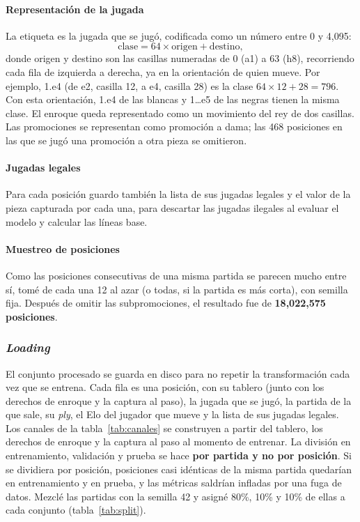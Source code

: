 \documentclass[a4paper,12pt,twocolumn]{article}
\begin{document}
\paragraph{Representación de la jugada}

La etiqueta es la jugada que se jugó, codificada como un número entre 0 y 4,095:
\begin{equation*}
	\text{clase} = 64 \times \text{origen} + \text{destino},
\end{equation*}
donde origen y destino son las casillas numeradas de 0 (a1) a 63 (h8), recorriendo cada fila de izquierda a derecha, ya en la orientación de quien mueve. Por ejemplo, 1.e4 (de e2, casilla 12, a e4, casilla 28) es la clase $64\times12+28=796$. Con esta orientación, 1.e4 de las blancas y 1\dots e5 de las negras tienen la misma clase. El enroque queda representado como un movimiento del rey de dos casillas. Las promociones se representan como promoción a dama; las 468 posiciones en las que se jugó una promoción a otra pieza se omitieron.

\paragraph{Jugadas legales}

Para cada posición guardo también la lista de sus jugadas legales y el valor de la pieza capturada por cada una, para descartar las jugadas ilegales al evaluar el modelo y calcular las líneas base.

\paragraph{Muestreo de posiciones}

Como las posiciones consecutivas de una misma partida se parecen mucho entre sí, tomé de cada una 12 al azar (o todas, si la partida es más corta), con semilla fija. Después de omitir las subpromociones, el resultado fue de \textbf{18,022,575 posiciones}.

\subsubsection{\textit{Loading}}

El conjunto procesado se guarda en disco para no repetir la transformación cada vez que se entrena. Cada fila es una posición, con su tablero (junto con los derechos de enroque y la captura al paso), la jugada que se jugó, la partida de la que sale, su \textit{ply}, el Elo del jugador que mueve y la lista de sus jugadas legales. Los canales de la tabla~\ref{tab:canales} se construyen a partir del tablero, los derechos de enroque y la captura al paso al momento de entrenar.
\newline
La división en entrenamiento, validación y prueba se hace \textbf{por partida y no por posición}. Si se dividiera por posición, posiciones casi idénticas de la misma partida quedarían en entrenamiento y en prueba, y las métricas saldrían infladas por una fuga de datos. Mezclé las partidas con la semilla 42 y asigné 80\%, 10\% y 10\% de ellas a cada conjunto (tabla~\ref{tab:split}).
\end{document}
